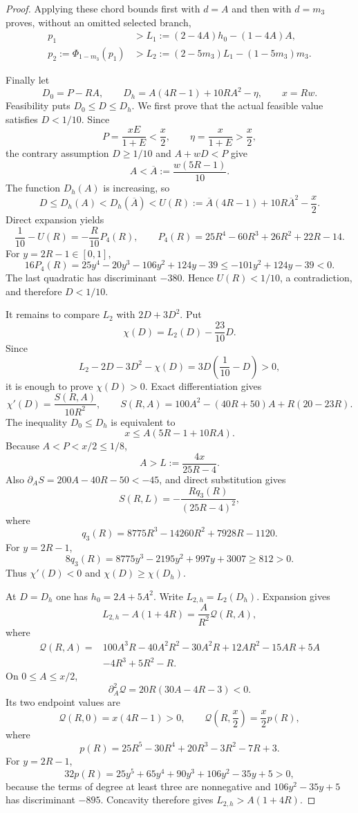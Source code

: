 \begin{proof}
Applying these chord bounds first with $d=A$ and then with $d=m_3$ proves,
without an omitted selected branch,
\begin{align*}
 p_1&>L_1:=(2-4A)h_0-(1-4A)A,\\
 p_2:=\Phi_{1-m_3}(p_1)&>L_2:=(2-5m_3)L_1-(1-5m_3)m_3.
\end{align*}

Finally let
\[
 D_0=P-RA,\qquad
 D_h=A(4R-1)+10RA^2-\eta,\qquad x=Rw.
\]
Feasibility puts $D_0\le D\le D_h$.  We first prove that the actual
feasible value satisfies $D<1/10$.  Since
\[
 P=\frac{xE}{1+E}<\frac x2,\qquad
 \eta=\frac{x}{1+E}>\frac x2,
\]
the contrary assumption $D\ge1/10$ and $A+wD<P$ give
\[
 A<\overline A:=\frac{w(5R-1)}{10}.
\]
The function $D_h(A)$ is increasing, so
\[
 D\le D_h(A)<D_h(\overline A)
 <U(R):=\overline A(4R-1)+10R\overline A^2-\frac x2.
\]
Direct expansion yields
\[
 \frac1{10}-U(R)=-\frac{R}{10}P_4(R),
 \qquad
 P_4(R)=25R^4-60R^3+26R^2+22R-14.
\]
For $y=2R-1\in[0,1]$,
\[
 16P_4(R)=25y^4-20y^3-106y^2+124y-39
 \le-101y^2+124y-39<0.
\]
The last quadratic has discriminant $-380$.  Hence $U(R)<1/10$, a
contradiction, and therefore $D<1/10$.

It remains to compare $L_2$ with $2D+3D^2$.  Put
\[
 \chi(D)=L_2(D)-\frac{23}{10}D.
\]
Since
\[
 L_2-2D-3D^2-\chi(D)=3D\left(\frac1{10}-D\right)>0,
\]
it is enough to prove $\chi(D)>0$. Exact differentiation gives
\[
 \chi'(D)=\frac{S(R,A)}{10R^2},\qquad
 S(R,A)=100A^2-(40R+50)A+R(20-23R).
\]
The inequality $D_0\le D_h$ is equivalent to
\[
 x\le A(5R-1+10RA).
\]
Because $A<P<x/2\le1/8$,
\[
 A>L:=\frac{4x}{25R-4}.
\]
Also $\partial_A S=200A-40R-50<-45$, and direct substitution gives
\[
 S(R,L)=-\frac{R q_3(R)}{(25R-4)^2},
\]
where
\[
 q_3(R)=8775R^3-14260R^2+7928R-1120.
\]
For $y=2R-1$,
\[
 8q_3(R)=8775y^3-2195y^2+997y+3007\ge812>0.
\]
Thus $\chi'(D)<0$ and $\chi(D)\ge\chi(D_h)$.

At $D=D_h$ one has $h_0=2A+5A^2$. Write $L_{2,h}=L_2(D_h)$.
Expansion gives
\[
 L_{2,h}-A(1+4R)=\frac{A}{R^2}\mathcal Q(R,A),
\]
where
\[
\begin{aligned}
 \mathcal Q(R,A)={}&100A^3R-40A^2R^2-30A^2R
 +12AR^2-15AR+5A\\
 &-4R^3+5R^2-R.
\end{aligned}
\]
On $0\le A\le x/2$,
\[
 \partial_A^2\mathcal Q=20R(30A-4R-3)<0.
\]
Its two endpoint values are
\[
 \mathcal Q(R,0)=x(4R-1)>0,\qquad
 \mathcal Q\left(R,\frac x2\right)=\frac{x}{2}p(R),
\]
where
\[
 p(R)=25R^5-30R^4+20R^3-3R^2-7R+3.
\]
For $y=2R-1$,
\[
 32p(R)=25y^5+65y^4+90y^3+106y^2-35y+5>0,
\]
because the terms of degree at least three are nonnegative and
$106y^2-35y+5$ has discriminant $-895$.  Concavity therefore gives
$L_{2,h}>A(1+4R)$.


\end{proof}
